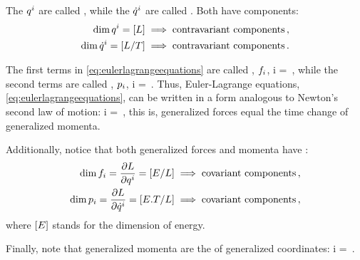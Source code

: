 \begin{note}
The ${q}^{i}$ are called , while the ${\dot{q}}^{i}$ are called . Both have  components:
\begin{align*}
\dim {q}^{i} = \left[{L}\right]   &\implies\text{contravariant components}\,,\\
\dim {\dot{q}}^{i} = \left[{L/T}\right] &\implies\text{contravariant components}\,.
\end{align*}

The first terms in \cref{eq:eulerlagrangeequations} are called , ${f}_{i}$,
\beq
\gfor i = \,,
\eeq
while the second terms are called , ${p}_{i}$,
\beq
\gmom i = \,.
\eeq
Thus, Euler-Lagrange equations, \cref{eq:eulerlagrangeequations}, can be written in a form analogous to Newton's second law of motion:
\beq
\gfor i = \,,
\eeq
this is, generalized forces equal the time change of generalized momenta.

Additionally, notice that both generalized forces and momenta have :
\begin{align*}
\dim {f}_{i} = \dfrac{\partial{L}}{\partial{{q}^{i}}} = \left[{E/L}\right]             &\implies\text{covariant components}\,,\\
\dim {p}_{i} = \dfrac{\partial{L}}{\partial{{\dot{q}}^{i}}} = \left[{E.T/L}\right] &\implies\text{covariant components}\,,
\end{align*}
where $\left[{E}\right]$ stands for the dimension of energy.

Finally, note that generalized momenta are the  of generalized coordinates:
\beq
\gmom i = \,.
\eeq
\end{note}

